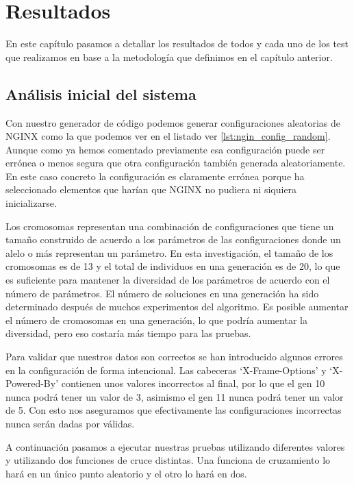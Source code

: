 \chapter{Resultados}

En este capítulo pasamos a detallar los resultados de todos y cada uno de los test que realizamos en base a la metodología que definimos en el capítulo anterior.

\section{Análisis inicial del sistema}

Con nuestro generador de código podemos generar configuraciones aleatorias de NGINX como la que podemos ver en el listado ver \ref{lst:ngin_config_random}. Aunque como ya hemos comentado previamente esa configuración puede ser errónea o menos segura que otra configuración también generada aleatoriamente. En este caso concreto la configuración es claramente errónea porque ha seleccionado elementos que harían que NGINX no pudiera ni siquiera inicializarse.

\bigskip
Los cromosomas representan una combinación de configuraciones que tiene un tamaño construido de acuerdo a los parámetros de las configuraciones donde un alelo o más representan un parámetro. En esta investigación, el tamaño de los cromosomas es de 13 y el total de individuos en una generación es de 20, lo que es suficiente para mantener la diversidad de los parámetros de acuerdo con el número de parámetros. El número de soluciones en una generación ha sido determinado después de muchos experimentos del algoritmo. Es posible aumentar el número de cromosomas en una generación, lo que podría aumentar la diversidad, pero eso costaría más tiempo para las pruebas.

\bigskip
Para validar que nuestros datos son correctos se han introducido algunos errores en la configuración de forma intencional. Las cabeceras `X-Frame-Options' y `X-Powered-By' contienen unos valores incorrectos al final, por lo que el gen 10 nunca podrá tener un valor de 3, asimismo el gen 11 nunca podrá tener un valor de 5. Con esto nos aseguramos que efectivamente las configuraciones incorrectas nunca serán dadas por válidas.

\bigskip
A continuación pasamos a ejecutar nuestras pruebas utilizando diferentes valores y utilizando dos funciones de cruce distintas. Una funciona de cruzamiento lo hará en un único punto aleatorio y el otro lo hará en dos.

